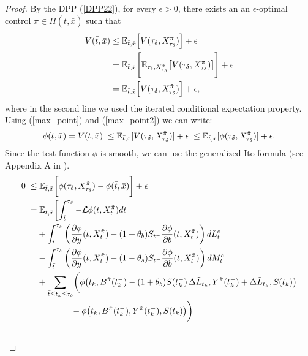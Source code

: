 \begin{proof}
By the DPP (\ref{DPP22}), for every $\epsilon > 0$, there exists an an $\epsilon$-optimal control $\pi \in \Pi(\bar t,\bar x)$ such that
\begin{align}
  V(\bar t, \bar x) & \leq \mathbb{E}_{\bar t, \bar x} \Bigl[ V(\tau_{\delta}, X^{\pi}_{\tau_{\delta}}) \Bigr] +\epsilon \\ \nonumber
                    &= \mathbb{E}_{\bar t, \bar x} \Biggl[ \mathbb{E}_{\tau_{\delta}, X^{\tilde \pi}_{\tau_{\delta}}} \bigl[ V(\tau_{\delta}, X^{\pi}_{\tau_{\delta}}) \bigr] \Biggr] +\epsilon \\ \nonumber
                    &= \mathbb{E}_{\bar t, \bar x} \Bigl[ V(\tau_{\delta}, X^{\tilde \pi}_{\tau_{\delta}}) \Bigr] +\epsilon,
\end{align}
where in the second line we used the iterated conditional expectation property.
Using (\ref{max_point}) and (\ref{max_point2}) we can write:
\begin{equation*}
 \phi(\bar t, \bar x) = V(\bar t, \bar x) \; \leq \mathbb{E}_{\bar t, \bar x}[V(\tau_{\delta}, X^{\tilde \pi}_{\tau_{\delta}})] + \epsilon \; 
 \leq \mathbb{E}_{\bar t, \bar x}[\phi(\tau_{\delta}, X^{\tilde \pi}_{\tau_{\delta}})] + \epsilon.
\end{equation*}
Since the test function $\phi$ is smooth, we can use the generalized It\=o formula (see Appendix A in \cite{OkSu01}).
\begin{align}\label{first_inequality}
 0 \; \leq & \; \E_{\bar t, \bar x} \biggl[ \phi(\tau_{\delta}, X^{\tilde \pi}_{\tau_{\delta}}) - \phi(\bar t, \bar x) \biggr] + \epsilon \\ \nonumber
    = & \; \E_{\bar t, \bar x} \biggl[ \int_{\bar t}^{\tau_{\delta}} -\LL \phi(t,X^{\tilde \pi}_t) dt \\ \nonumber
    & + \int_{\bar t}^{\tau_{\delta}} \left(\frac{\partial \phi}{\partial y}(t, X^{\tilde \pi}_t) -(1+\theta_b) S_{t^-} \frac{\partial \phi}{\partial b}( t, X^{\tilde \pi}_t)\right) dL^c_t \\ \nonumber
    & - \int_{\bar t}^{\tau_{\delta}} \left(\frac{\partial \phi}{\partial y}( t, X^{\tilde \pi}_t)-(1-\theta_s) S_{t^-} \frac{\partial \phi}{\partial b}( t, X^{\tilde \pi}_t)\right) dM^c_t \\ \nonumber
    & + \sum_{\bar t \leq t_k \leq \tau_{\delta}} \biggl( \phi \bigl( t_k, B^{\tilde \pi}(t_k^-) - (1+\theta_b) S(t_k^-)\, \Delta \tilde L_{t_k}, Y^{\tilde \pi}(t_k^-) 
      + \Delta \tilde L_{t_k}, S(t_k) \bigr) \\ \nonumber 
    & \hspace{4em} - \phi \bigl(t_k, B^{\tilde \pi}(t_k^-), Y^{\tilde \pi}(t_k^-), S(t_k) \bigr) \biggr) \\ \nonumber

\end{align}
\end{proof}
